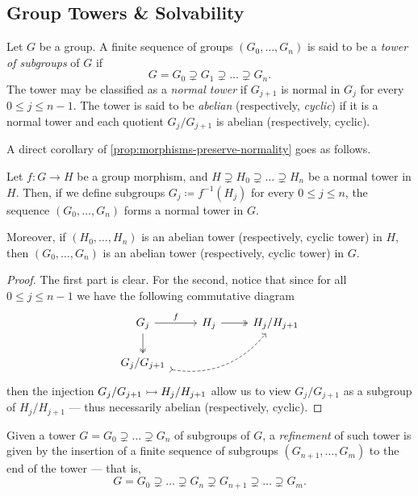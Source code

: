 \subsection{Group Towers \& Solvability}

\begin{definition}
\label{def:tower-subgroups}
Let \(G\) be a group. A finite sequence of groups \((G_0, \dots, G_n)\) is said
to be a \emph{tower of subgroups} of \(G\) if
\[
  G = G_0 \supsetneq G_1 \supsetneq \dots \supsetneq G_n.
\]
The tower may be classified as a \emph{normal tower} if \(G_{j + 1}\) is normal
in \(G_j\) for every \(0 \leq j \leq n - 1\). The tower is said to be
\emph{abelian} (respectively, \emph{cyclic}) if it is a normal tower and each
quotient \(G_j/G_{j+1}\) is abelian (respectively, cyclic).
\end{definition}

A direct corollary of \cref{prop:morphisms-preserve-normality} goes as follows.

\begin{corollary}
\label{cor:morphism-normal-towers}
Let \(f: G \to H\) be a group morphism, and \(H \supsetneq H_0 \supsetneq \dots
\supsetneq H_n\) be a normal tower in \(H\). Then, if we define subgroups \(G_j
\coloneq f^{-1}(H_j)\) for every \(0 \leq j \leq n\), the sequence \((G_0,
\dots, G_n)\) forms a normal tower in \(G\).

Moreover, if \((H_0, \dots, H_n)\) is an abelian tower (respectively, cyclic
tower) in \(H\), then \((G_0, \dots, G_n)\) is an abelian tower (respectively,
cyclic tower) in \(G\).
\end{corollary}

\begin{proof}
The first part is clear. For the second, notice that since for all \(0 \leq j
\leq n-1\) we have the following commutative diagram
\[
  \begin{tikzcd}
    G_j \ar[d, two heads] \ar[r, "f"] &H_j \ar[r, two heads] & H_j/H_{j+1} \\
    G_j/G_{j+1} \ar[rru, bend right, tail, dashed]
  \end{tikzcd}
\]
then the injection \(G_j/G_{j+1} \rightarrowtail H_j/H_{j+1}\) allow us to view
\(G_j/G_{j+1}\) as a subgroup of \(H_j/H_{j+1}\) --- thus necessarily abelian
(respectively, cyclic).
\end{proof}

\begin{definition}[Refinement]
\label{def:refinement-tower}
Given a tower \(G = G_0 \supsetneq \dots \supsetneq G_n\) of subgroups of \(G\),
a \emph{refinement} of such tower is given by the insertion of a finite
sequence of subgroups \((G_{n+1}, \dots, G_m)\) to the end of the tower --- that
is,
\[
  G = G_{0} \supsetneq \dots \supsetneq G_n \supsetneq G_{n+1} \supsetneq \dots
  \supsetneq G_{m}.
\]
\end{definition}

